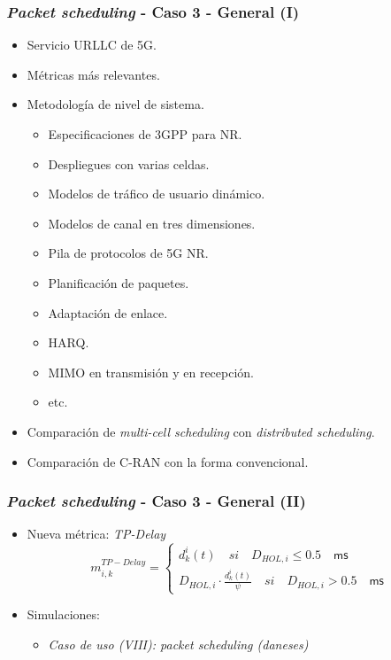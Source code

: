 \documentclass{beamer}
\begin{document}
\begin{frame}
\frametitle{\textit{Packet scheduling} - Caso 3 - General (I)}

\begin{itemize}
\item Servicio URLLC de 5G.
\item Métricas más relevantes.
\item {
	Metodología de nivel de sistema.
	\begin{itemize}
	\item Especificaciones de 3GPP para NR.
	\item Despliegues con varias celdas.
	\item Modelos de tráfico de usuario dinámico.
	\item Modelos de canal en tres dimensiones.
	\item Pila de protocolos de 5G NR.
	\item Planificación de paquetes.
	\item Adaptación de enlace.
	\item HARQ.
	\item MIMO en transmisión y en recepción.
	\item etc.
	\end{itemize}
}
\item Comparación de \textit{multi-cell scheduling} con \textit{distributed scheduling}.
\item Comparación de C-RAN con la forma convencional.
\end{itemize}
\end{frame}

\begin{frame}
\frametitle{\textit{Packet scheduling} - Caso 3 - General (II)}

\begin{itemize}
\item {
	Nueva métrica: \textit{TP-Delay}
	$$
	m_{i, k}^{TP-Delay} = \left\lbrace
	\begin{array}{lr}
	d_{k}^i (t) \quad si \quad D_{HOL, i} \leq \mathsf{0.5 \quad ms} \\
	D_{HOL, i} \cdot \frac {d_{k}^i (t)} { \psi } \quad si \quad D_{HOL, i} > \mathsf{0.5 \quad ms}
	\end{array}
	\right.
	$$
}
\item {
	Simulaciones:
	\begin{itemize}
	\item \textit{Caso de uso (VIII): packet scheduling (daneses)}
	\end{itemize}
}
\end{itemize}
\end{frame}
\end{document}
